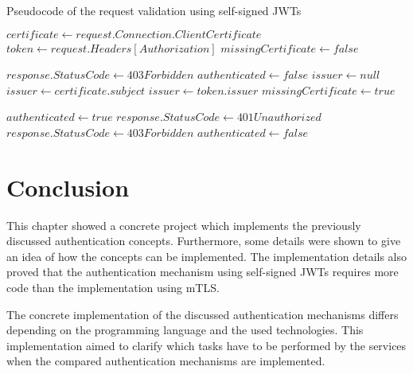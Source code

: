 \begin{algorithm}[H]
	\caption{Pseudocode of the request validation using self-signed JWTs}\label{alg:jwt}
	\begin{algorithmic}
		\State $certificate \gets request.Connection.ClientCertificate$
		\State $token \gets request.Headers[Authorization]$
		\State $missingCertificate \gets false$

		\State $response.StatusCode \gets 403Forbidden$
		\State $authenticated \gets false$
		\Else
		\State $issuer \gets null$
		\State $issuer \gets certificate.subject$
		\EndIf
		\EndIf
		\Else
		\State $issuer \gets token.issuer$
		\Else
		\State $missingCertificate \gets true$
		\EndIf
		\EndIf

		\State $authenticated \gets true$
		\Else
		\State $response.StatusCode \gets 401Unauthorized$
		\Else
		\State $response.StatusCode \gets 403Forbidden$
		\EndIf
		\State $authenticated \gets false$
		\EndIf
		\EndIf
	\end{algorithmic}
\end{algorithm}

\section{Conclusion}
This chapter showed a concrete project which implements the previously discussed authentication concepts.
Furthermore, some details were shown to give an idea of how the concepts can be implemented.
The implementation details also proved that the authentication mechanism using self-signed JWTs requires more code than the implementation using mTLS.

The concrete implementation of the discussed authentication mechanisms differs depending on the programming language and the used technologies.
This implementation aimed to clarify which tasks have to be performed by the services when the compared authentication mechanisms are implemented.
